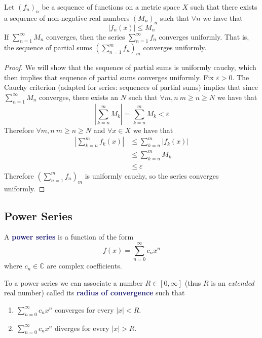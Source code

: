 \documentclass[11pt]{article}
\numberwithin{equation}{section}
\newcommand{\navy}[1]{\textcolor{MidnightBlue}{\bf #1}}
\theoremstyle{definition}
\theoremstyle{definition}
\newcommand\abs[1]{\left| #1 \right|}
\newcommand{\1}{\mathbbm 1}
\newcommand{\e}{\varepsilon}
\newcommand{\CC}{\mathbb C}
\begin{document}
\begin{theorem}
	Let $(f_n)_n$ be a sequence of functions on a metric space $X$ such that there exists a sequence of non-negative real numbers $(M_n)_n$ such that $\forall n$ we have that
	\begin{equation}
		|f_n(x)| \leq M_n 
	\end{equation}
	If $\sum_{n=1}^\infty M_n$ converges, then the series $\sum_{n=1}^\infty f_n$ converges uniformly. That is, the sequence of partial sums $\left(\sum_{n=1}^m f_n\right)_m$ converges uniformly.  
\end{theorem}
\begin{proof}
	We will show that the sequence of partial sums is uniformly cauchy, which then implies that sequence of partial sums converges uniformly. Fix $\e > 0$. The Cauchy criterion (adapted for series: sequences of partial sums) implies that since $\sum_{n=1}^\infty M_n$ converges, there exists an $N$ such that $\forall m,n \ m\geq n\geq N$ we have that
	\begin{equation*}
		\abs{\sum_{k=n}^m M_k} = \sum_{k=n}^m M_k  < \e
	\end{equation*}
	Therefore $\forall m,n \ m\geq n\geq N$ and $\forall x \in X$ we have that
	\begin{align*}
		\abs{\sum_{k=n}^m f_k(x)} &\leq \sum_{k=n}^m \abs{f_k(x)} \tag{$\Delta$} \\
		&\leq \sum_{k=n}^m M_k \\
		&\leq \e
	\end{align*}
	Therefore $\left(\sum_{n=1}^m f_n\right)_m$ is uniformly cauchy, so the series converges uniformly. 
\end{proof}

\subsection{Power Series}

\begin{definition}
	A \navy{power series} is a function of the form
	\begin{equation}
		f(x) = \sum_{n=0}^\infty c_n x^n
	\end{equation}
	where $c_n \in \CC$ are complex coefficients. 
\end{definition}

\begin{definition}
	To a power series we can associate a number $R \in [0, \infty]$ (thus $R$ is an \emph{extended} real number) called its \navy{radius of convergence} such that  
	\begin{enumerate}
		\item $\sum_{n=0}^\infty c_n x^n$ converges for every $|x| < R$.
		\item $\sum_{n=0}^\infty c_n x^n$ diverges for every $|x| > R$.
	\end{enumerate}
\end{definition}
\end{document}
